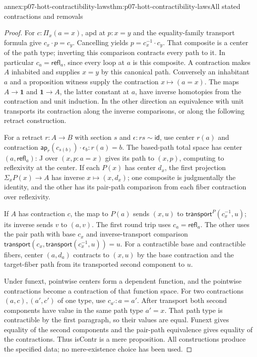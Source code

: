 \begin{annexitem}{annex:p07-hott-contractibility-laws}{thm:p07-hott-contractibility-laws}{All stated contractions and removals}
\begin{proof}
For $c:\Pi_x(a=x)$, apd at $p:x=y$ and the equality-family transport
formula give $c_x\cdot p=c_y$. Cancelling yields
$p=c_x^{-1}\cdot c_y$. That composite is a center of the path type;
inverting this comparison contracts every path to it. In particular
$c_a=\mathsf{refl}_a$, since every loop at $a$ is this composite.
A contraction makes $A$ inhabited and supplies $x=y$ by this canonical
path. Conversely an inhabitant $a$ and a proposition witness supply
the contraction $x\mapsto(a=x)$. The maps $A\to\mathbf1$ and
$\mathbf1\to A$, the latter constant at $a$, have inverse homotopies
from the contraction and unit induction. In the other direction an
equivalence with unit transports its contraction along the inverse
comparisons, or along the following retract construction.

For a retract $r:A\to B$ with section $s$ and $\epsilon:r s\sim\mathsf{id}$,
use center $r(a)$ and contraction
$\mathsf{ap}_r(c_{s(b)})\cdot\epsilon_b:r(a)=b$.
The based-path total space has center $(a,\mathsf{refl}_a)$:
J over $(x,p:a=x)$ gives its path to $(x,p)$, computing to reflexivity
at the center. If each $P(x)$ has center $d_x$, the first projection
$\Sigma_xP(x)\to A$ has inverse $x\mapsto(x,d_x)$; one composite
is judgmentally the identity, and the other has its pair-path comparison
from each fiber contraction over reflexivity.

If $A$ has contraction $c$, the map to $P(a)$ sends $(x,u)$ to
$\mathsf{transport}^{P}(c_x^{-1},u)$; its inverse sends $v$ to $(a,v)$.
The first round trip uses $c_a=\mathsf{refl}_a$. The other uses the
pair path with base $c_x$ and inverse-transport comparison
$\mathsf{transport}(c_x,\mathsf{transport}(c_x^{-1},u))=u$.
For a contractible base and contractible fibers, center $(a,d_a)$
contracts to $(x,u)$ by the base contraction and the target-fiber path
from its transported second component to $u$.

Under funext, pointwise centers form a dependent function, and the
pointwise contractions become a contraction of that function space.
For two contractions $(a,c),(a',c')$ of one type, use $c_{a'}:a=a'$.
After transport both second components have value in the same path
type $a'=x$. That path type is contractible by the first paragraph,
so their values are equal. Funext gives equality of the second
components and the pair-path equivalence gives equality of the
contractions. Thus isContr is a mere proposition. All constructions
produce the specified data; no mere-existence choice has been used.
\end{proof}
\end{annexitem}

